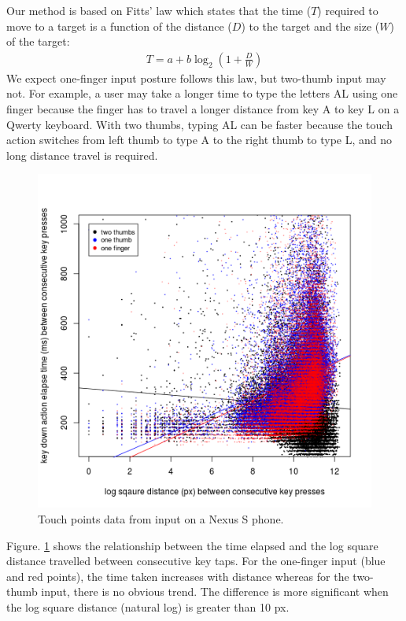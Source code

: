 \documentclass{sigchi}
\begin{document}
Our method is based on Fitts' law which states that the time ($T$) required to move to a target is a function of the distance ($D$) to the target and the size ($W$) of the target:
\begin{align}
T = a + b\log_2(1 + \frac{D}{W})
\end{align}                                                  
We expect one-finger input posture follows this law,  but two-thumb input may not. For example, a user may take a longer time to type the letters AL using one finger because the finger has to travel a longer distance from key A to key L on a Qwerty keyboard. With two thumbs, typing AL can be faster because the touch action switches from left thumb to type A to the right thumb to type L, and no long distance travel is required.

\begin{figure}[tb]
  \centering
  \includegraphics[width=0.9\columnwidth]{figures/time-distance.png}
  \caption{Touch points data from input on a Nexus S phone.}
  \label{fig:time-distance}
\end{figure}

Figure. \ref{fig:time-distance} shows the relationship between the time elapsed 
and the log square distance travelled between consecutive key taps. For the one-finger input (blue and red points), the time taken
increases with distance whereas for the two-thumb input, there is no obvious
trend. The difference is more significant when the log square distance (natural
log) is greater than 10 px.
\end{document}
